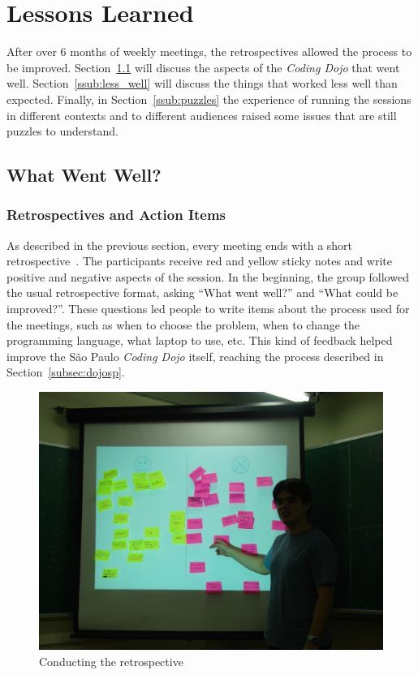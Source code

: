 \section{Lessons Learned}\label{sec:lessons_learned}

After over 6 months of weekly meetings, the retrospectives allowed
the process to be improved. Section~\ref{ssub:well} will discuss the
aspects of the \emph{Coding Dojo} that went well. Section~\ref{ssub:less_well}
will discuss the things that worked less well than expected. Finally, in
Section~\ref{ssub:puzzles} the experience of running the sessions in different
contexts and to different audiences raised some issues that are still puzzles
to understand.

\subsection{What Went Well?}\label{ssub:well}

\subsubsection{Retrospectives and Action Items}

As described in the previous section, every meeting ends with a
short retrospective~\cite{Retro}. The participants receive red and yellow sticky
notes and write positive and negative aspects of the session. In the
beginning, the group followed the usual retrospective format,
asking ``What went well?'' and ``What could be improved?''.
These questions led people to write items about the process used for
the meetings, such as when to choose the problem, when to change the
programming language, what laptop to use, etc. This kind of feedback
helped improve the São Paulo \emph{Coding Dojo} itself, reaching the
process described in Section~\ref{subsec:dojosp}.

\begin{figure}[htp]
\centering
\includegraphics[width=\columnwidth]{retrospective}
\caption{Conducting the retrospective}\label{fig:retrospective}
\end{figure}

